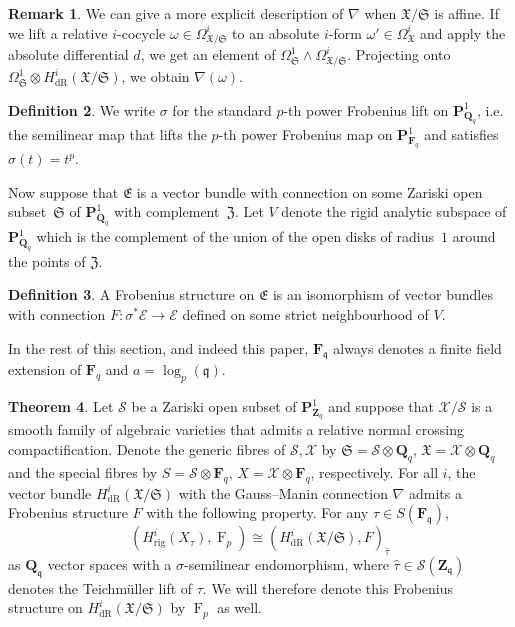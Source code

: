 \documentclass[a4paper,11pt]{article}
\numberwithin{equation}{section}
\newcommand{\ZZ}{\mathbf{Z}} %
\newcommand{\QQ}{\mathbf{Q}} %
\newcommand{\FF}{\mathbf{F}} %
\DeclareMathOperator{\Frob}{F}           %
\providecommand{\HdR}{H_{\text{dR}}}    %
\providecommand{\Hrig}{H_{\text{rig}}}  %
\theoremstyle{definition}
\newtheorem{thm}{Theorem}[section]
\newtheorem{defn}[thm]{Definition}
\newtheorem{rem}[thm]{Remark}
\begin{document}
\begin{rem}
We can give a more explicit description of $\nabla$ when $\mathfrak{X}/\mathfrak{S}$ is affine. If we lift a 
relative $i$-cocycle $\omega \in \Omega^i_{\mathfrak{X}/\mathfrak{S}}$ to an absolute $i$-form 
$\omega' \in \Omega^i_{\mathfrak{X}}$ and apply the absolute differential $d$, we get an element of 
$\Omega^1_{\mathfrak{S}} \wedge \Omega^i_{\mathfrak{X}/\mathfrak{S}}$. Projecting onto 
$\Omega^1_{\mathfrak{S}} \otimes \HdR^i(\mathfrak{X}/\mathfrak{S})$, we obtain $\nabla(\omega)$. 
\end{rem}

\begin{defn} \label{defn:sigma}
We write $\sigma$ for the standard $p$-th power Frobenius lift on $\mathbf{P}^1_{\QQ_q}$, i.e. 
the semilinear map that lifts the $p$-th power Frobenius map on $\mathbf{P}^1_{\FF_q}$ and
satisfies $\sigma(t)=t^p$. 
\end{defn}

Now suppose that $\mathfrak{E}$ is a vector bundle with connection on 
some Zariski open subset~$\mathfrak{S}$ of $\mathbf{P}^1_{\QQ_q}$ with 
complement~$\mathfrak{Z}$. Let $V$ denote the rigid analytic subspace 
of $\mathbf{P}^1_{\QQ_q}$ which is the complement of the union of the 
open disks of radius~$1$ around the points of $\mathfrak{Z}$.

\begin{defn}
A Frobenius structure on $\mathfrak{E}$ is an isomorphism of vector bundles with connection 
$F:\sigma^* \mathcal{E} \rightarrow \mathcal{E}$ defined on some strict neighbourhood of $V$. 
\end{defn}

In the rest of this section, and indeed this paper, $\FF_{\mathfrak{q}}$ always
denotes a finite field extension of $\FF_q$ and $a=\log_p(\mathfrak{q})$.

\begin{thm} \label{thm:frobstruc}
Let $\mathcal{S}$ be a Zariski open subset of $\mathbf{P}^1_{\ZZ_q}$ and suppose that 
$\mathcal{X}/\mathcal{S}$ is a smooth family of algebraic varieties that admits a relative
normal crossing compactification. Denote the generic fibres of $\mathcal{S},\mathcal{X}$ by
$\mathfrak{S}=\mathcal{S} \otimes \QQ_q$, $\mathfrak{X}=\mathcal{X} \otimes \QQ_q$
and the special fibres by $S=\mathcal{S} \otimes \FF_q$, $X=\mathcal{X} \otimes \FF_q$, respectively.
For all $i$, the vector bundle $\HdR^i(\mathfrak{X}/\mathfrak{S})$ with the
Gauss--Manin connection $\nabla$ admits a Frobenius structure $F$ with the following property.
For any $\tau \in S(\FF_{\mathfrak{q}})$,
\[
(\Hrig^i(X_{\tau}),\Frob_p) \cong (\HdR^i(\mathfrak{X}/\mathfrak{S}),F)_{\hat{\tau}}
\] 
as $\QQ_{\mathfrak{q}}$ vector spaces with a $\sigma$-semilinear endomorphism, where 
$\hat{\tau} \in \mathcal{S}(\ZZ_{\mathfrak{q}})$ denotes the Teichm\"uller lift of $\tau$. 
We will therefore denote this Frobenius structure on $\HdR^i(\mathfrak{X}/\mathfrak{S})$ by $\Frob_p$ 
as well.
\end{thm}
\end{document}
